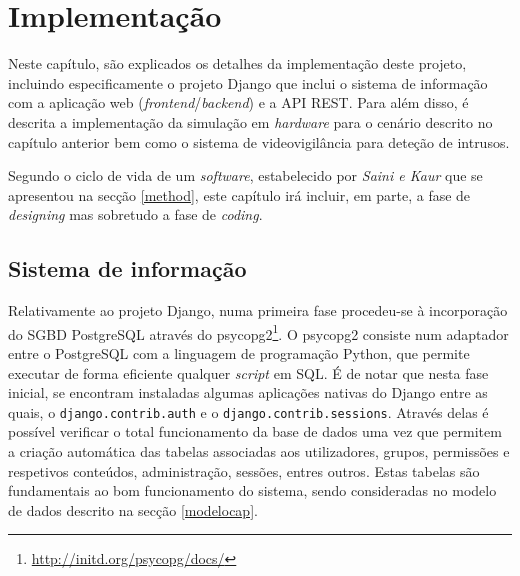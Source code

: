 



\chapter{Implementação}
\label{implementacao}





Neste capítulo, são explicados os detalhes da implementação deste projeto, incluindo especificamente o projeto Django que inclui o sistema de informação com a aplicação web (\textit{frontend}/\textit{backend}) e a API REST. Para além disso, é descrita a implementação da simulação em \textit{hardware} para o cenário descrito no capítulo anterior bem como o sistema de videovigilância para deteção de intrusos. 

Segundo o ciclo de vida de um \textit{software}, estabelecido por \textit{Saini e Kaur}\cite{Saini2014} que se apresentou na secção \ref{method}, este capítulo irá incluir, em parte, a fase de \textit{designing} mas sobretudo a fase de \textit{coding}. 





\section{Sistema de informação}


Relativamente ao projeto Django, numa primeira fase procedeu-se à incorporação do \ac{SGBD} PostgreSQL através do psycopg2\footnote{\url{http://initd.org/psycopg/docs/}}. O psycopg2 consiste num adaptador entre o PostgreSQL com a linguagem de programação Python, que permite executar de forma eficiente qualquer \textit{script} em \ac{SQL}. É de notar que nesta fase inicial, se encontram instaladas algumas aplicações nativas do Django entre as quais, o  \texttt{django.contrib.auth} e  o \texttt{django.contrib.sessions}. Através delas é possível verificar o total funcionamento da base de dados uma vez que permitem a criação automática das tabelas associadas aos utilizadores, grupos, permissões e respetivos conteúdos, administração, sessões, entres outros. Estas tabelas são fundamentais ao bom funcionamento do sistema, sendo consideradas no modelo de dados descrito na secção \ref{modelocap}. 


